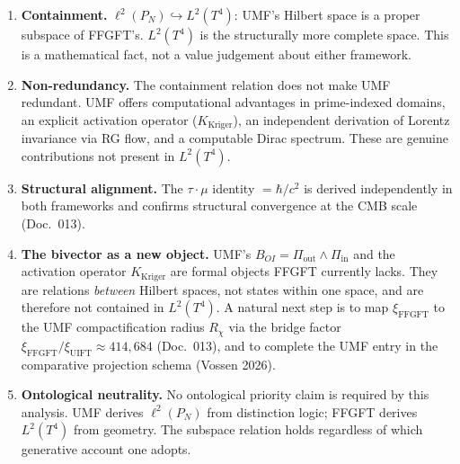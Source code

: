 \begin{enumerate}

  \item \textbf{Containment.}
    $\ell^2(P_N) \hookrightarrow L^2(T^4)$: UMF's Hilbert space is a proper
    subspace of FFGFT's. $L^2(T^4)$ is the structurally more complete space.
    This is a mathematical fact, not a value judgement about either framework.

  \item \textbf{Non-redundancy.}
    The containment relation does not make UMF redundant. UMF offers
    computational advantages in prime-indexed domains, an explicit activation
    operator ($K_\text{Kriger}$), an independent derivation of Lorentz
    invariance via RG flow, and a computable Dirac spectrum. These are genuine
    contributions not present in $L^2(T^4)$.

  \item \textbf{Structural alignment.}
    The \texorpdfstring{$\tau\cdot\mu$}{tau.mu} identity $= \hbar/c^2$
    is derived independently in both frameworks and confirms structural
    convergence at the CMB scale (Doc.~013).

  \item \textbf{The bivector as a new object.}
    UMF's $B_{OI} = \Pi_\text{out} \wedge \Pi_\text{in}$ and the activation
    operator $K_\text{Kriger}$ are formal objects FFGFT currently lacks.
    They are relations \emph{between} Hilbert spaces, not states within one
    space, and are therefore not contained in $L^2(T^4)$. A natural next step
    is to map $\xi_\text{FFGFT}$ to the UMF compactification radius $R_\chi$
    via the bridge factor $\xi_\text{FFGFT}/\xi_\text{UIFT} \approx 414{,}684$
    (Doc.~013), and to complete the UMF entry in the comparative projection
    schema (Vossen 2026).

  \item \textbf{Ontological neutrality.}
    No ontological priority claim is required by this analysis. UMF derives
    $\ell^2(P_N)$ from distinction logic; FFGFT derives $L^2(T^4)$ from
    geometry. The subspace relation holds regardless of which generative
    account one adopts.

\end{enumerate}

